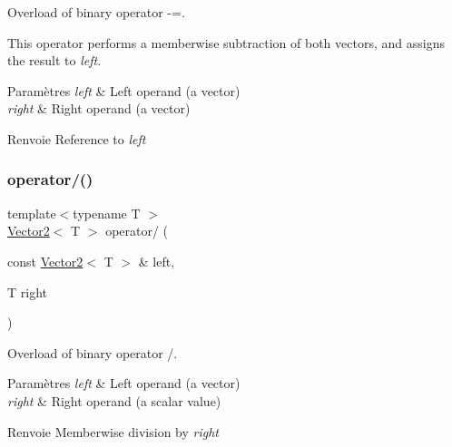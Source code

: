 Overload of binary operator -\/=. 

This operator performs a memberwise subtraction of both vectors, and assigns the result to {\itshape left}.


\begin{DoxyParams}{Paramètres}
{\em left} & Left operand (a vector) \\
\hline
{\em right} & Right operand (a vector)\\
\hline
\end{DoxyParams}
\begin{DoxyReturn}{Renvoie}
Reference to {\itshape left} 
\end{DoxyReturn}
\mbox{\label{classsf_1_1Vector2_a7409dd89cb3aad6c3bc6622311107311}} 
\subsubsection{\texorpdfstring{operator/()}{operator/()}}
{\footnotesize\ttfamily template$<$typename T $>$ \\
\hyperlink{classsf_1_1Vector2}{Vector2}$<$ T $>$ operator/ (\begin{DoxyParamCaption}\item[{const \hyperlink{classsf_1_1Vector2}{Vector2}$<$ T $>$ \&}]{left,  }\item[{T}]{right }\end{DoxyParamCaption})\hspace{0.3cm}{\ttfamily [related]}}



Overload of binary operator /. 


\begin{DoxyParams}{Paramètres}
{\em left} & Left operand (a vector) \\
\hline
{\em right} & Right operand (a scalar value)\\
\hline
\end{DoxyParams}
\begin{DoxyReturn}{Renvoie}
Memberwise division by {\itshape right} 
\end{DoxyReturn}
\mbox{\label{classsf_1_1Vector2_ac4d293c9dc7954ccfd5e373972f38b03}} 
